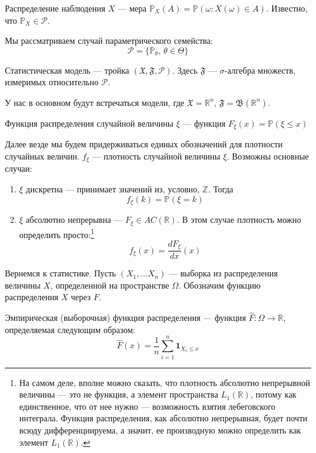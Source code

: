 \documentclass[12pt, russian]{article}
\begin{document}
\begin{mydef}
Распределение наблюдения $X$ --- мера $\mathbb{P}_X(A) = \mathbb{P}(\omega : X(\omega)\in A)$. Известно, что $\mathbb{P}_X \in \mathcal{P}$.
\end{mydef}

Мы рассматриваем случай параметрического семейства:
$$ \mathcal{P} = \{\mathbb{P}_{\theta},\,\theta\in\Theta \} $$

\begin{mydef}
Статистическая модель --- тройка $(\mathfrak{X}, \mathfrak{F}, \mathcal{P})$. Здесь $\mathfrak{F}$ --- $\sigma$-алгебра множеств, измеримых относительно $\mathcal{P}$.
\end{mydef}

У нас в основном будут встречаться модели, где $\mathfrak{X} = \mathbb{R}^n,\,\mathfrak{F} = \mathfrak{B}(\mathbb{R}^n)$.

\begin{mydef}
Функция распределения случайной величины $\xi$ --- функция $F_{\xi}(x) = \mathbb{P}(\xi \leq x)$
\end{mydef}

Далее везде мы будем придерживаться единых обозначений для плотности случайных величин. $f_{\xi}$ --- плотность случайной величины $\xi$. Возможны основные случаи:
\begin{enumerate}
\item $\xi$ дискретна --- принимает значений из, условно, $\mathbb{Z}$. Тогда
$$ f_{\xi}(k) = \mathbb{P}(\xi = k) $$

\item $\xi$ абсолютно непрерывна --- $F_{\xi}\in AC(\mathbb{R})$. В этом случае плотность можно определить просто:\footnote{На самом деле, вполне можно сказать, что плотность абсолютно непрерывной величины --- это не функция, а элемент пространства $L_1(\mathbb{R})$, потому как единственное, что от нее нужно --- возможность взятия лебеговского интеграла. Функция распределения, как абсолютно непрерывная, будет почти всюду дифференциируема, а значит, ее производную можно определить как элемент $L_1(\mathbb{R})$.}
$$ f_{\xi}(x) = \frac{dF_{\xi}}{dx}(x)$$

\end{enumerate}

Вернемся к статистике. Пусть $(X_1, \ldots X_n)$ --- выборка из распределения величины $X$, определенной на пространстве $\Omega$. Обозначим функцию распределения $X$ через $F$. 

\begin{mydef}
Эмпирическая (выборочная) функция распределения --- функция $\hat{F} : \Omega \rightarrow \mathbb{R}$, определяемая следующим образом:
$$ \hat{F}(x) = \frac{1}{n} \sum\limits_{i=1}^n{\mathbf{1}_{X_i \leq x}} $$ 
\end{mydef}
\end{document}
